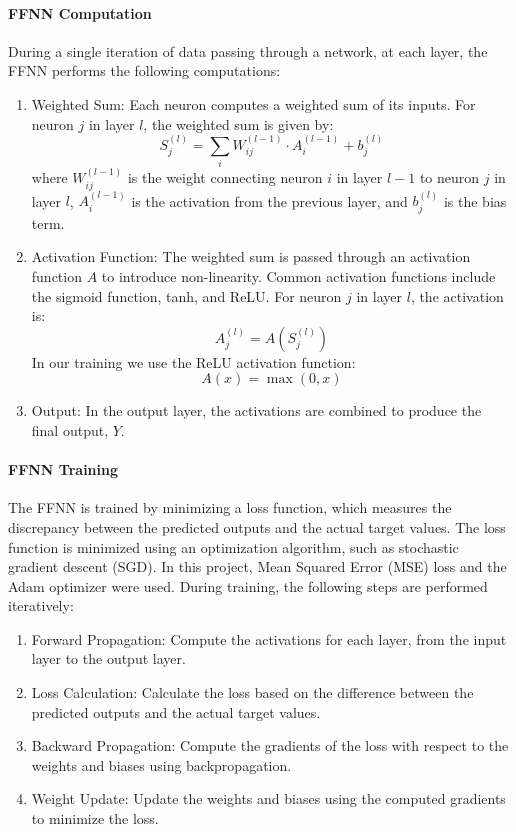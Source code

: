 \documentclass{article}
\begin{document}
    \paragraph{FFNN Computation}

    During a single iteration of data passing through a network, at each layer, the FFNN performs the following computations:

    \begin{enumerate}[label={(\arabic*)}]
        \item Weighted Sum: Each neuron computes a weighted sum of its inputs. For neuron $j$ in layer $l$, the weighted sum is given by:
        \[
        S_j^{(l)} = \sum_{i} W_{ij}^{(l-1)} \cdot A_i^{(l-1)} + b_j^{(l)}
        \]
        where $W_{ij}^{(l-1)}$ is the weight connecting neuron $i$ in layer $l-1$ to neuron $j$ in layer $l$, $A_i^{(l-1)}$ is the activation from the previous layer, and $b_j^{(l)}$ is the bias term.

        \item Activation Function: The weighted sum is passed through an activation function $A$ to introduce non-linearity. Common activation functions include the sigmoid function, tanh, and ReLU. For neuron $j$ in layer $l$, the activation is:
        \[
        A_j^{(l)} = A(S_j^{(l)})
        \]
        In our training we use the ReLU activation function:
        \[
        A(x) = \max(0, x)
        \]
        \item Output: In the output layer, the activations are combined to produce the final output, $Y$.
    \end{enumerate}

    \paragraph{FFNN Training}

    The FFNN is trained by minimizing a loss function, which measures the discrepancy between the predicted outputs and the actual target values. The loss function is minimized using an optimization algorithm, such as stochastic gradient descent (SGD). In this project, Mean Squared Error (MSE) loss and the Adam optimizer were used. During training, the following steps are performed iteratively:

    \begin{enumerate}[label={(\arabic*)}]
        \item Forward Propagation: Compute the activations for each layer, from the input layer to the output layer.
        
        \item Loss Calculation: Calculate the loss based on the difference between the predicted outputs and the actual target values.
        
        \item Backward Propagation: Compute the gradients of the loss with respect to the weights and biases using backpropagation.
        
        \item Weight Update: Update the weights and biases using the computed gradients to minimize the loss.
    \end{enumerate}
\end{document}

